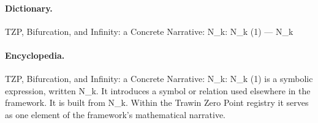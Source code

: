 \paragraph{Dictionary.}
TZP, Bifurcation, and Infinity: a Concrete Narrative: N\_k: N\_k (1) — N\_k

\paragraph{Encyclopedia.}
TZP, Bifurcation, and Infinity: a Concrete Narrative: N\_k: N\_k (1) is a symbolic expression, written N\_k. It introduces a symbol or relation used elsewhere in the framework. It is built from N\_k. Within the Trawin Zero Point registry it serves as one element of the framework's mathematical narrative.
